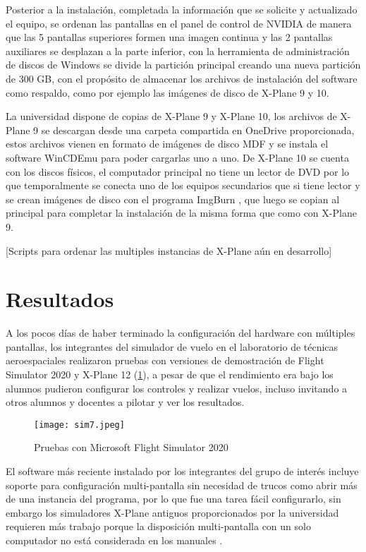 Posterior a la instalación, completada la información que se solicite y actualizado el equipo, se ordenan las pantallas en el panel de control de NVIDIA de manera que las 5 pantallas superiores formen una imagen continua y las 2 pantallas auxiliares se desplazan a la parte inferior, con la herramienta de administración de discos de Windows se divide la partición principal creando una nueva partición de 300 GB, con el propósito de almacenar los archivos de instalación del software como respaldo, como por ejemplo las imágenes de disco de X-Plane 9 y 10.

La universidad dispone de copias de X-Plane 9 y X-Plane 10, los archivos de X-Plane 9 se descargan desde una carpeta compartida en OneDrive proporcionada, estos archivos vienen en formato de imágenes de disco MDF y se instala el software WinCDEmu \cite{wincdemu} para poder cargarlas uno a uno. De X-Plane 10 se cuenta con los discos físicos, el computador principal no tiene un lector de DVD por lo que temporalmente se conecta uno de los equipos secundarios que si tiene lector y se crean imágenes de disco con el programa ImgBurn \cite{imgburn}, que luego se copian al principal para completar la instalación de la misma forma que como con X-Plane 9.

[Scripts para ordenar las multiples instancias de X-Plane aún en desarrollo]

\section{Resultados}

A los pocos días de haber terminado la configuración del hardware con múltiples pantallas, los integrantes del simulador de vuelo en el laboratorio de técnicas aeroespaciales realizaron pruebas con versiones de demostración de Flight Simulator 2020 y X-Plane 12 (\ref{fig:sim7}), a pesar de que el rendimiento era bajo los alumnos pudieron configurar los controles y realizar vuelos, incluso invitando a otros alumnos y docentes a pilotar y ver los resultados.

\begin{figure}[h]
	\centering
	\texttt{[image: sim7.jpeg]}
	\caption{Pruebas con Microsoft Flight Simulator 2020}
	\label{fig:sim7}
\end{figure}

El software más reciente instalado por los integrantes del grupo de interés incluye soporte para configuración multi-pantalla sin necesidad de trucos como abrir más de una instancia del programa, por lo que fue una tarea fácil configurarlo, sin embargo los simuladores X-Plane antiguos proporcionados por la universidad requieren más trabajo porque la disposición multi-pantalla con un solo computador no está considerada en los manuales \cite{manual9}.

